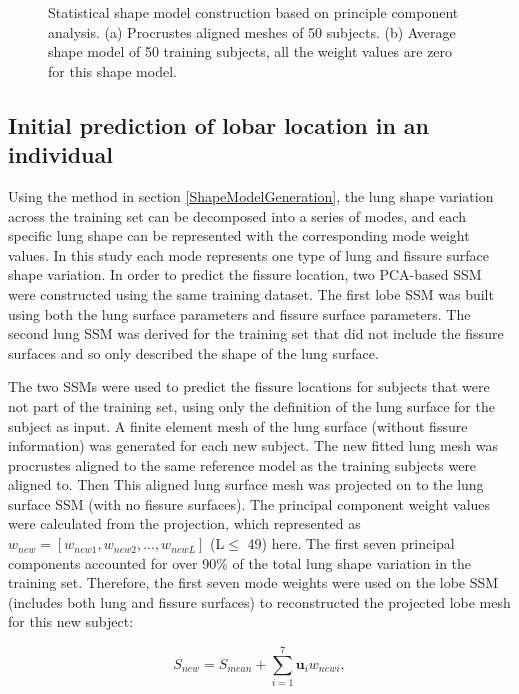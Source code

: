 {\begin{figure}[htbp]
\begin{subfigure}{.4\linewidth}
  \caption{}
  \label{fig:PCAMeshTraining-b} 
\end{subfigure}
\caption{Statistical shape model construction based on principle component analysis. (a) Procrustes aligned meshes of 50 subjects. (b) Average shape model of 50 training subjects, all the weight values are zero for this shape model.}
\label{fig:PCAMeshTraining}
\end{figure}

\subsection{Initial prediction of lobar location in an individual}

Using the method in section \ref{ShapeModelGeneration}, the lung shape variation across the training set can be decomposed into a series of modes, and each specific lung shape can be represented with the corresponding mode weight values. In this study each mode represents one type of lung and fissure surface shape variation. In order to predict the fissure location, two PCA-based SSM were constructed using the same training dataset. The first lobe SSM was built using both the lung surface parameters and fissure surface parameters. The second lung SSM was derived for the training set that did not include the fissure surfaces and so only described the shape of the lung surface.

The two SSMs were used to predict the fissure locations for subjects that were not part of the training set, using only the definition of the lung surface for the subject as input. A finite element mesh of the lung surface (without fissure information) was generated for each new subject. The new fitted lung mesh was procrustes aligned to the same reference model as the training subjects were aligned to. Then This aligned lung surface mesh was projected on to the lung surface SSM (with no fissure surfaces). The principal component weight values were calculated from the projection, which represented as $w_{new} = [w_{new1}, w_{new2}, ..., w_{newL}]$ (L$\leq$ 49) here. The first seven principal components accounted for over 90\% of the total lung shape variation in the training set. Therefore, the first seven mode weights were used on the lobe SSM (includes both lung and fissure surfaces) to reconstructed the projected lobe mesh for this new subject:

\begin{equation}
 \label{eq:FissurePrediction1}
 S_{new} = S_{mean} + \sum_{i=1}^7 \mathbf{u}_i w_{newi},
\end{equation}

}

